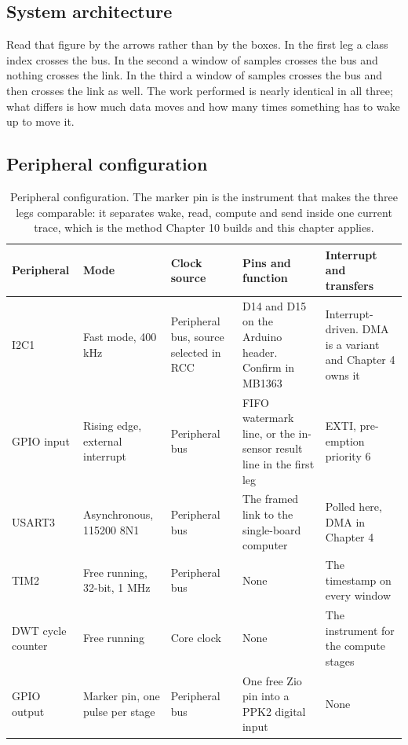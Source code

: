 \subsection*{System architecture}


Read that figure by the arrows rather than by the boxes. In the first leg a
class index crosses the bus. In the second a window of samples crosses the bus
and nothing crosses the link. In the third a window of samples crosses the bus
and then crosses the link as well. The work performed is nearly identical in all
three; what differs is how much data moves and how many times something has to
wake up to move it.

\subsection*{Peripheral configuration}

\begin{table}[H]\centering\small
\begin{tabular}{p{22mm}p{26mm}p{24mm}p{30mm}p{30mm}}
\toprule
Peripheral & Mode & Clock source & Pins and function & Interrupt and transfers \\
\midrule
I2C1 & Fast mode, 400 kHz & Peripheral bus, source selected in RCC & D14 and D15 on the Arduino header. Confirm in MB1363 & Interrupt-driven. DMA is a variant and Chapter 4 owns it \\
GPIO input & Rising edge, external interrupt & Peripheral bus & FIFO watermark line, or the in-sensor result line in the first leg & EXTI, pre-emption priority 6 \\
USART3 & Asynchronous, 115200 8N1 & Peripheral bus & The framed link to the single-board computer & Polled here, DMA in Chapter 4 \\
TIM2 & Free running, 32-bit, 1 MHz & Peripheral bus & None & The timestamp on every window \\
DWT cycle counter & Free running & Core clock & None & The instrument for the compute stages \\
GPIO output & Marker pin, one pulse per stage & Peripheral bus & One free Zio pin into a PPK2 digital input & None \\
\bottomrule
\end{tabular}
\caption{Peripheral configuration. The marker pin is the instrument that makes the three legs comparable: it separates wake, read, compute and send inside one current trace, which is the method Chapter 10 builds and this chapter applies.}
\end{table}

